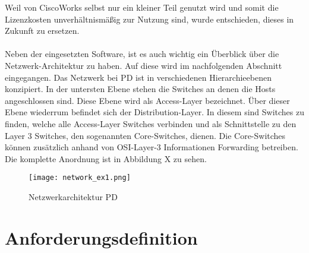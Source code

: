 Weil von CiscoWorks selbst nur ein kleiner Teil genutzt wird und somit die Lizenzkosten unverhältnismäßig zur Nutzung sind, wurde entschieden, dieses in Zukunft zu ersetzen.\\\\
Neben der eingesetzten Software, ist es auch wichtig ein Überblick über die Netzwerk-Architektur zu haben.
Auf diese wird im nachfolgenden Abschnitt eingegangen.
Das Netzwerk bei PD ist in verschiedenen Hierarchieebenen konzipiert.
In der untersten Ebene stehen die Switches an denen die Hosts angeschlossen sind. Diese Ebene wird als Access-Layer bezeichnet.
Über dieser Ebene wiederrum befindet sich der Distribution-Layer. In diesem sind Switches zu finden, welche alle Access-Layer Switches verbinden und als Schnittstelle zu den Layer 3 Switches, den sogenannten Core-Switches, dienen.
Die Core-Switches können zusätzlich anhand von OSI-Layer-3 Informationen Forwarding betreiben.
Die komplette Anordnung ist in Abbildung X zu sehen.

\begin{figure}[H]
\centering
\texttt{[image: network\_ex1.png]}
\caption{Netzwerkarchitektur PD}
\label{fig:show_s1_s2_p1_n1}
\end{figure}

\section{Anforderungsdefinition}
\label{sec:anfdef}


